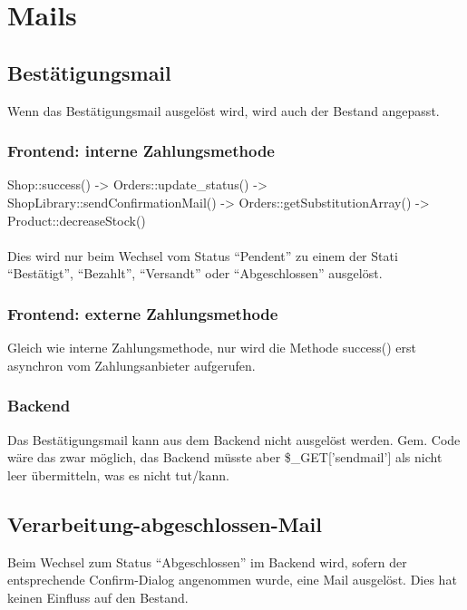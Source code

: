 \documentclass[a4paper]{scrreprt}
\begin{document}
    \chapter{Mails}
        \section{Bestätigungsmail}
            Wenn das Bestätigungsmail ausgelöst wird, wird auch der Bestand angepasst.

            \subsection{Frontend: interne Zahlungsmethode}
            Shop::success() -> Orders::update\_status() -> ShopLibrary::sendConfirmationMail()
            -> Orders::getSubstitutionArray() -> Product::decreaseStock() \\ \\
            Dies wird nur beim Wechsel vom Status ``Pendent'' zu einem der Stati
            ``Bestätigt'', ``Bezahlt'', ``Versandt'' oder ``Abgeschlossen'' ausgelöst.

            \subsection{Frontend: externe Zahlungsmethode}
            Gleich wie interne Zahlungsmethode, nur wird die Methode success() erst
            asynchron vom Zahlungsanbieter aufgerufen.

            \subsection{Backend}
            Das Bestätigungsmail kann aus dem Backend nicht ausgelöst werden. Gem.
            Code wäre das zwar möglich, das Backend müsste aber \$\_GET['sendmail']
            als nicht leer übermitteln, was es nicht tut/kann.

        \section{Verarbeitung-abgeschlossen-Mail}
            Beim Wechsel zum Status ``Abgeschlossen'' im Backend wird, sofern
            der entsprechende Confirm-Dialog angenommen wurde, eine Mail
            ausgelöst. Dies hat keinen Einfluss auf den Bestand.
\end{document}
